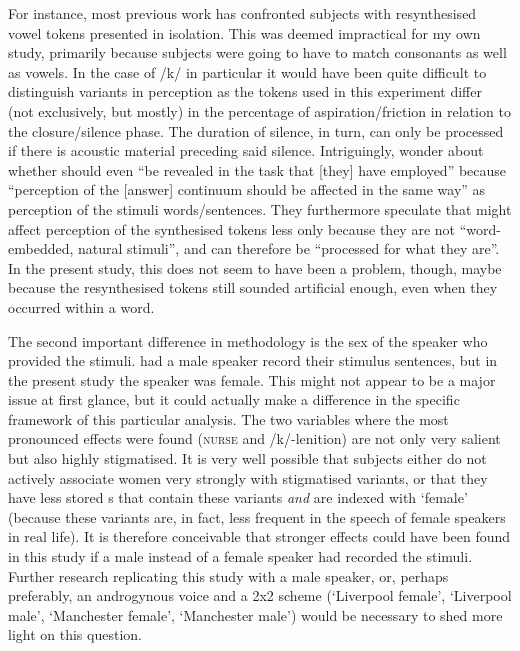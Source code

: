 For instance, most previous work has confronted subjects with resynthesised vowel tokens presented in isolation.
This was deemed impractical for my own study, primarily because subjects were going to have to match consonants as well as vowels.
In the case of /k/ in particular it would have been quite difficult to distinguish variants in perception as the tokens used in this experiment differ (not exclusively, but mostly) in the percentage of aspiration/friction in relation to the closure/silence phase.
The duration of silence, in turn, can only be processed if there is acoustic material preceding said silence.
Intriguingly, \textcite[887--888]{haydrager2010} wonder about whether  should even ``be revealed in the task that [they] have employed'' because ``perception of the [answer] continuum should be affected in the same way'' as perception of the stimuli words/sentences.
They furthermore speculate that  might affect perception of the synthesised tokens less only because they are not ``word-embedded, natural stimuli'', and can therefore be ``processed for what they are''.
In the present study, this does not seem to have been a problem, though, maybe because the resynthesised tokens still sounded artificial enough, even when they occurred within a word.

The second important difference in methodology is the sex of the speaker who provided the stimuli.
\textcite{hayetal2006a,haydrager2010} had a male speaker record their stimulus sentences, but in the present study the speaker was female.
This might not appear to be a major issue at first glance, but it could actually make a difference in the specific framework of this particular analysis.
The two variables where the most pronounced  effects were found (\textsc{nurse} and /k/-lenition) are not only very salient but also highly stigmatised.
It is very well possible that subjects either do not actively associate women very strongly with stigmatised variants, or that they have less stored s that contain these variants \emph{and} are indexed with `female' (because these variants are, in fact, less frequent in the speech of female speakers in real life).
It is therefore conceivable that stronger  effects could have been found in this study if a male instead of a female speaker had recorded the stimuli.
Further research replicating this study with a male speaker, or, perhaps preferably, an androgynous voice and a 2x2  scheme (`Liverpool female', `Liverpool male', `Manchester female', `Manchester male') would be necessary to shed more light on this question.

